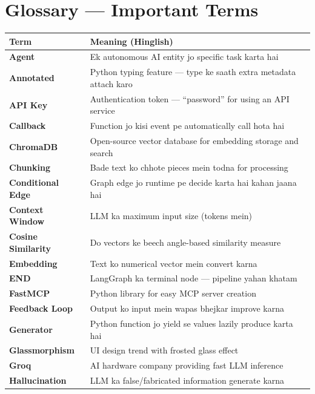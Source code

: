 \documentclass[12pt, a4paper]{article}
\begin{document}
\newpage
\section{Glossary --- Important Terms}

\begin{longtable}{|>{\bfseries\small}p{4cm}|p{9.5cm}|}
\hline
\rowcolor{accentpurple!15}
\textbf{Term} & \textbf{Meaning (Hinglish)} \\
\hline\hline
Agent & Ek autonomous AI entity jo specific task karta hai \\
\hline
Annotated & Python typing feature --- type ke saath extra metadata attach karo \\
\hline
API Key & Authentication token --- ``password'' for using an API service \\
\hline
Callback & Function jo kisi event pe automatically call hota hai \\
\hline
ChromaDB & Open-source vector database for embedding storage and search \\
\hline
Chunking & Bade text ko chhote pieces mein todna for processing \\
\hline
Conditional Edge & Graph edge jo runtime pe decide karta hai kahan jaana hai \\
\hline
Context Window & LLM ka maximum input size (tokens mein) \\
\hline
Cosine Similarity & Do vectors ke beech angle-based similarity measure \\
\hline
Embedding & Text ko numerical vector mein convert karna \\
\hline
END & LangGraph ka terminal node --- pipeline yahan khatam \\
\hline
FastMCP & Python library for easy MCP server creation \\
\hline
Feedback Loop & Output ko input mein wapas bhejkar improve karna \\
\hline
Generator & Python function jo yield se values lazily produce karta hai \\
\hline
Glassmorphism & UI design trend with frosted glass effect \\
\hline
Groq & AI hardware company providing fast LLM inference \\
\hline
Hallucination & LLM ka false/fabricated information generate karna \\
\hline

\end{longtable}
\end{document}
